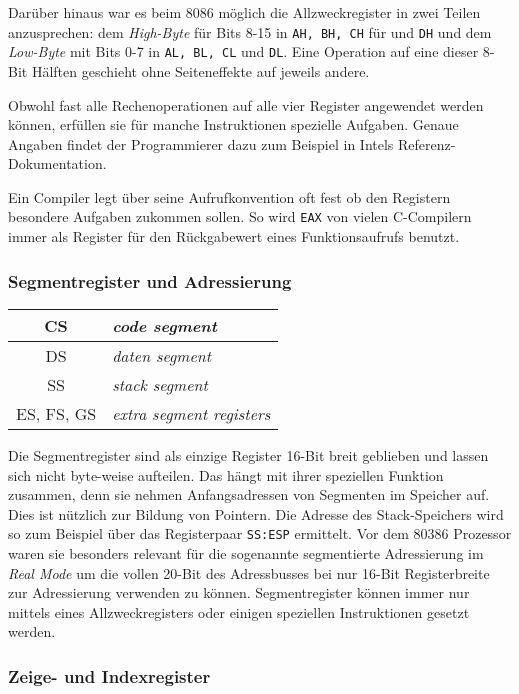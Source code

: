 Darüber hinaus war es beim 8086 möglich die Allzweckregister in zwei Teilen anzusprechen: dem \emph{High-Byte} für Bits 8-15 in {\tt AH, BH, CH} für  und {\tt DH} und dem \emph{Low-Byte} mit Bits 0-7 in {\tt AL, BL, CL} und {\tt DL}. Eine Operation auf eine dieser 8-Bit Hälften geschieht ohne Seiteneffekte auf jeweils andere.

Obwohl fast alle Rechenoperationen auf alle vier Register angewendet werden können, erfüllen sie für manche Instruktionen spezielle Aufgaben. Genaue Angaben findet der Programmierer dazu zum Beispiel in Intels Referenz-Dokumentation. \cite{intelreferenz}

Ein Compiler legt über seine Aufrufkonvention oft fest ob den Registern besondere Aufgaben zukommen sollen. So wird {\tt EAX} von vielen C-Compilern immer als Register für den Rückgabewert eines Funktionsaufrufs benutzt. \cite{wp:callconv}

\subsubsection{Segmentregister und Adressierung}

\begin{tabular}{|c|l|}
\hline CS & \emph{code segment} \\
\hline DS & \emph{daten segment} \\
\hline SS & \emph{stack segment} \\
\hline ES, FS, GS & \emph {extra segment registers} \\
\hline
\end{tabular}

Die Segmentregister sind als einzige Register 16-Bit breit geblieben und lassen sich nicht byte-weise aufteilen. Das hängt mit ihrer speziellen Funktion zusammen, denn sie nehmen Anfangsadressen von Segmenten im Speicher auf. Dies ist nützlich zur Bildung von Pointern. Die Adresse des Stack-Speichers wird so zum Beispiel über das Registerpaar {\tt SS:ESP} ermittelt. Vor dem 80386 Prozessor waren sie besonders relevant für die sogenannte segmentierte Adressierung im \emph{Real Mode} um die vollen 20-Bit des Adressbusses bei nur 16-Bit Registerbreite zur Adressierung verwenden zu können.
Segmentregister können immer nur mittels eines Allzweckregisters oder einigen speziellen Instruktionen gesetzt werden.


\subsubsection{Zeige- und Indexregister}


